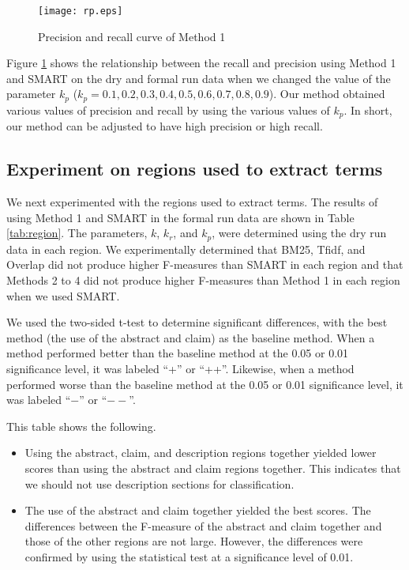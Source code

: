 \documentclass[english]{jnlp_1.2c}
\begin{document}
\begin{figure}[t]
      \begin{center}
        \texttt{[image: rp.eps]} 
      \end{center}
    \caption{Precision and recall curve of Method 1}
    \label{fig:rp}
\end{figure}

Figure \ref{fig:rp} shows the relationship between the recall and precision 
using Method 1 and SMART on the dry and formal run data
when we changed the value of the parameter $k_p$ 
\linebreak
($k_p = 0.1, 0.2, 0.3, 0.4, 0.5, 0.6, 0.7, 0.8, 0.9$).  
Our method obtained 
various values of precision and recall 
by using the various values of $k_p$.
In short, 
our method can be adjusted 
to have high precision or high recall. 

\subsection{Experiment on regions used to extract terms}

We next experimented with the regions used to extract terms.
The results of using
Method 1 and SMART in the formal run data
are shown in Table \ref{tab:region}. 
The parameters, $k$, $k_r$, and $k_p$,
were determined using the dry run data in each region. 
We experimentally determined that 
BM25, Tfidf, and Overlap did not produce higher F-measures than SMART in each region 
and that Methods 2 to 4 did not produce higher F-measures than Method 1 in each region 
when we used SMART. 

We used the two-sided t-test to determine significant differences,
with the best method (the use of the abstract and claim) as the baseline method.
When a method performed better than the baseline method at the 0.05 or 0.01 significance level,
it was labeled ``+'' or ``++''.
Likewise, when a method performed worse than the baseline method at the 0.05 or 0.01 significance level,
it was labeled ``$-$'' or ``$--$''.

This table shows the following.
\begin{itemize}
\item 
Using the abstract, claim, and description regions together
yielded
lower scores than using the abstract and claim regions together.
This indicates that
we should not use 
description sections for classification.

\item 
The use of the abstract and claim together
yielded the best scores.  
The differences between 
the F-measure of the abstract and claim together
and those of the other regions
are not large. 
However, the differences 
were confirmed by using the statistical test
at a significance level of 0.01.
\end{itemize}
\end{document}
